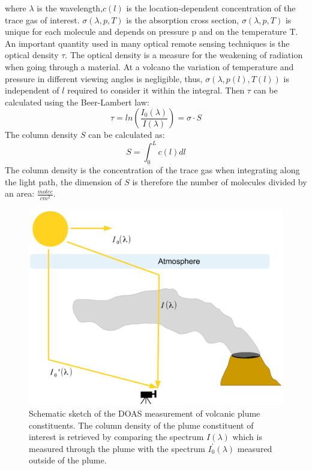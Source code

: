 \documentclass  [
  paper    = a4,
  BCOR     = 10mm,
  twoside,
  fontsize = 12pt,
  fleqn,
  toc      = bibnumbered,
  toc      = listofnumbered,
  numbers  = noendperiod,
  headings = normal,
  listof   = leveldown,
  version  = 3.03
]                                       {scrreprt}
\begin{document}
	where $\lambda$ is the wavelength,$c\left(l\right)$ is the location-dependent concentration of the trace gas of interest. $\sigma\left(\lambda,p,T\right)$ is the absorption cross section, $\sigma\left(\lambda,p,T\right)$ is unique for each molecule and depends on pressure p and on the temperature T.\\
	An important quantity used in many optical remote sensing techniques is the optical density $\tau$. The optical density is a measure for the weakening of radiation when going through a material. At a volcano the variation of temperature and pressure in different viewing angles is negligible, thus, $\sigma\left(\lambda,p(l),T(l)\right)$ is independent of $l$ required to consider it within the integral. Then  $\tau$ can be calculated using the Beer-Lambert law:
	\begin{equation}
	\tau = ln\left(\frac{I_{0}\left(\lambda\right)}{I\left(\lambda\right)}\right) = \sigma\cdot S
	\end{equation}
	The column density $S$ can be calculated as:
	\begin{equation}
	S = \int_{0}^{L}c\left(l\right)dl
	\end{equation}
	The column density is the concentration of the trace gas when integrating along the light path, the dimension of $S$ is therefore the number of molecules divided by an area: $\frac{molec}{cm^2}$.\\
	\begin{figure}
		\centering
		\includegraphics[width=0.7\linewidth]{Bilder/DOASFunction}
		\caption{Schematic sketch of the DOAS measurement of volcanic plume constituents. The column density of the plume constituent of interest is retrieved by comparing the spectrum $I\left(\lambda \right)$ which is measured through the plume with the spectrum  $I_0^{'}\left(\lambda \right)$ measured outside of the plume.}
		\label{fig:doasfunction}
	\end{figure}
	
\end{document}
